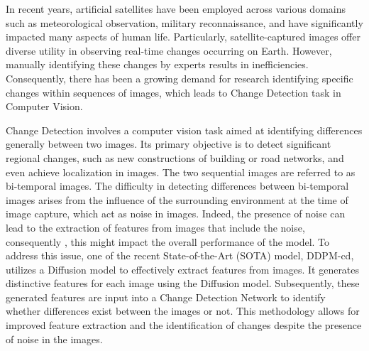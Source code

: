 \documentclass[../main.tex]{subfiles}
\begin{document}
\textbf{}
In recent years, artificial satellites have been employed across various domains such as meteorological observation, military reconnaissance, and have significantly impacted many aspects of human life. Particularly, satellite-captured images offer diverse utility in observing real-time changes occurring on Earth. However, manually identifying these changes by experts results in inefficiencies. Consequently, there has been a growing demand for research identifying specific changes within  sequences of images, which leads to Change Detection task in Computer Vision.

Change Detection involves a computer vision task aimed at identifying differences generally between two images. Its primary objective is to detect significant regional changes, such as new constructions of building or road networks, and even achieve localization in images. The two sequential images are referred to as bi-temporal images. The difficulty in detecting differences between bi-temporal images arises from the influence of the surrounding environment at the time of image capture, which act as noise in images. Indeed, the presence of noise can lead to the extraction of features from images that include the noise, consequently , this might impact the overall performance of the model. To address this issue, one of the recent State-of-the-Art (SOTA) model, DDPM-cd, utilizes a Diffusion model to effectively extract features from images.\cite{bandara2022ddpmcd} It generates distinctive features for each image using the Diffusion model. Subsequently, these generated features are input into a Change Detection Network to identify whether differences exist between the images or not. This methodology allows for improved feature extraction and the identification of changes despite the presence of noise in the images.
\end{document}
